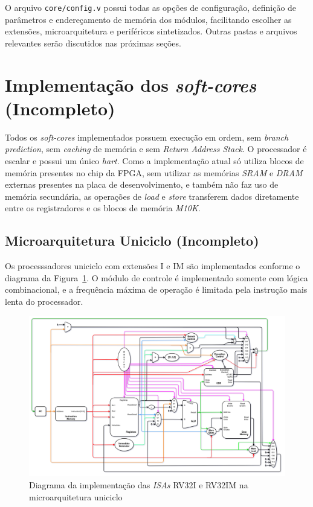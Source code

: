    {
        O arquivo \texttt{core/config.v} possui todas as opções de configuração,
        definição de parâmetros e endereçamento de memória dos módulos, facilitando
        escolher as extensões, microarquitetura e periféricos sintetizados. Outras
        pastas e arquivos relevantes serão discutidos nas próximas seções.
    }


\section{Implementação dos \textit{soft-cores} (Incompleto)}
    { Todos os \textit{soft-cores} implementados possuem execução em ordem, sem
        \textit{branch prediction}, sem \textit{caching} de memória e sem
        \textit{Return Address Stack}. O processador é escalar e possui um
        único \textit{hart}. Como a implementação atual só utiliza blocos de
        memória presentes no chip da FPGA, sem utilizar as memórias
        \textit{SRAM} e \textit{DRAM} externas presentes na placa de
        desenvolvimento, e também não faz uso de memória secundária, as operações
        de \textit{load} e \textit{store} transferem dados diretamente entre os
        registradores e os blocos de memória \textit{M10K}.
    }

    \subsection{Microarquitetura Uniciclo (Incompleto)}

        { Os processsadores uniciclo com extensões I e IM são implementados
            conforme o diagrama da Figura~\ref{fig:diagram_rv32i_uni}. O módulo
            de controle é implementado somente com lógica combinacional, e a
            frequência máxima de operação é limitada pela instrução mais lenta
            do processador.
        }

        \begin{figure}[H]
        \centering
            \includegraphics[width=.9\linewidth]{../images/uarch_diagrams/singlecycle-RV32I-RV32IM.png}
            \caption{Diagrama da implementação das \textit{ISAs} RV32I e RV32IM na
            microarquitetura uniciclo}\label{fig:diagram_rv32i_uni}
        \end{figure}

